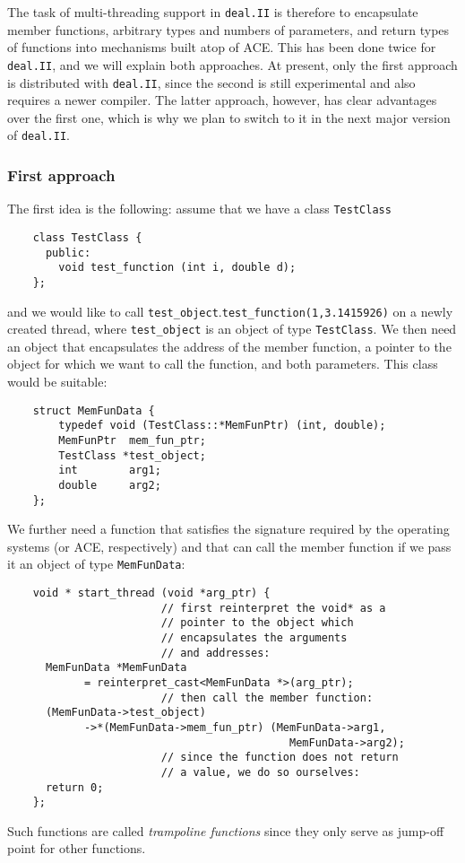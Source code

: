 \documentclass[11pt]{article}
\begin{document}
The task of multi-threading support in \texttt{deal.II} is therefore to
encapsulate member functions, arbitrary types and numbers of parameters, and
return types of functions into mechanisms built atop of ACE. This has been
done twice for \texttt{deal.II}, and we will explain both approaches. At
present, only the first approach is distributed with \texttt{deal.II}, since
the second is still experimental and also requires a newer compiler. The
latter approach, however, has clear advantages over the first one, which is
why we plan to switch to it in the next major version of \texttt{deal.II}.


\subsubsection{First approach}

The first idea is the following: assume that we have a class
\texttt{TestClass}
\begin{verbatim}
    class TestClass {
      public:
        void test_function (int i, double d);
    };
\end{verbatim}
and we would like to call
\texttt{test\_object}.\texttt{test\_function(1,3.1415926)} on a newly created
thread, where \texttt{test\_object} is 
an object of type \texttt{TestClass}. We then need an object that encapsulates
the address of the member function, a pointer to the object for which we want
to call the function, and both parameters. This class would be suitable:
\begin{verbatim}
    struct MemFunData {
        typedef void (TestClass::*MemFunPtr) (int, double);
        MemFunPtr  mem_fun_ptr;
        TestClass *test_object;
        int        arg1;
        double     arg2;
    };
\end{verbatim}

We further need a function that satisfies the signature required by the
operating systems (or ACE, respectively) and that can call the member function
if we pass it an object of type \texttt{MemFunData}:
\begin{verbatim}
    void * start_thread (void *arg_ptr) {
                        // first reinterpret the void* as a
                        // pointer to the object which
                        // encapsulates the arguments
                        // and addresses:
      MemFunData *MemFunData
            = reinterpret_cast<MemFunData *>(arg_ptr);
                        // then call the member function:
      (MemFunData->test_object)
            ->*(MemFunData->mem_fun_ptr) (MemFunData->arg1,
                                            MemFunData->arg2);
                        // since the function does not return
                        // a value, we do so ourselves:
      return 0;
    };
\end{verbatim}
Such functions are called \textit{trampoline functions} since they only serve
as jump-off point for other functions.
\end{document}
